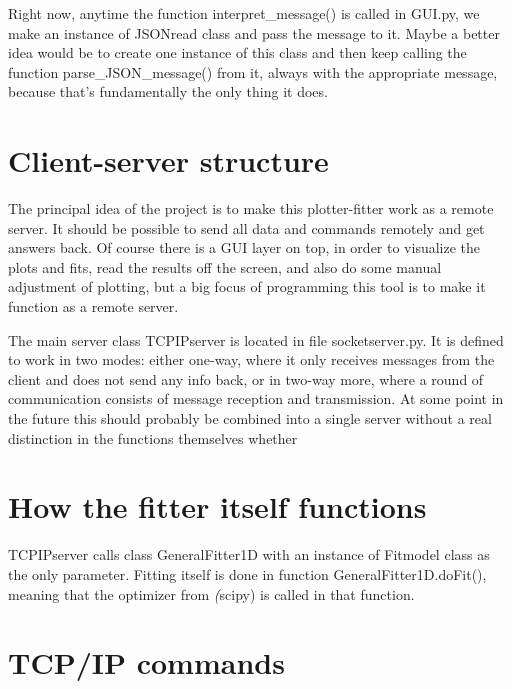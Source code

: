 \documentclass[11pt]{article} %
\begin{document}
Right now, anytime the function { interpret\_message()} is called in { GUI.py}, we make an instance of { JSONread} class and pass the message to it. Maybe a better idea would be to create one instance of this class and then keep calling the function { parse\_JSON\_message()} from it, always with the appropriate message, because that's fundamentally the only thing it does.

\section{Client-server structure}

The principal idea of the project is to make this plotter-fitter work as a remote server. It should be possible to send all data and commands remotely and get answers back. Of course there is a GUI layer on top, in order to visualize the plots and fits, read the results off the screen, and also do some manual adjustment of plotting, but a big focus of programming this tool is to make it function as a remote server.

The main server class { TCPIPserver} is located in file { socketserver.py}. It is defined to work in two modes: either one-way, where it only receives messages from the client and does not send any info back, or in two-way more, where a round of communication consists of message reception and transmission. { At some point in the future this should probably be combined into a single server without a real distinction in the functions themselves whether }

\section{How the fitter itself functions}

{ TCPIPserver} calls class { GeneralFitter1D} with an instance of { Fitmodel} class as the only parameter. Fitting itself is done in function { GeneralFitter1D.doFit()}, meaning that the optimizer from \textit(scipy) is called in that function.  

\section{TCP/IP commands}
\end{document}
